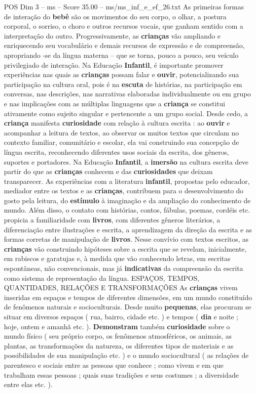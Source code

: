 \begin{textsample}{POS Dim 3 – ms – Score 35.00 – ms/ms\_inf\_e\_ef\_26.txt}
As primeiras formas de interação do \textbf{bebê} são os movimentos do seu corpo, o olhar, a postura corporal, o sorriso, o choro e outros recursos vocais, que ganham sentido com a interpretação do outro.
Progressivamente, as \textbf{crianças} vão ampliando e enriquecendo seu vocabulário e demais recursos de expressão e de compreensão, apropriando -se da língua materna – que se torna, pouco a pouco, seu veículo privilegiado de interação.
Na Educação \textbf{Infantil}, é importante promover experiências nas quais as \textbf{crianças} possam falar e \textbf{ouvir}, potencializando sua participação na cultura oral, pois é na \textbf{escuta} de histórias, na participação em conversas, nas descrições, nas narrativas elaboradas individualmente ou em grupo e nas implicações com as múltiplas linguagens que a \textbf{criança} se constitui ativamente como sujeito singular e pertencente a um grupo social.
Desde cedo, a \textbf{criança} manifesta \textbf{curiosidade} com relação à cultura escrita : ao \textbf{ouvir} e acompanhar a leitura de textos, ao observar os muitos textos que circulam no contexto familiar, comunitário e escolar, ela vai construindo sua concepção de língua escrita, reconhecendo diferentes usos sociais da escrita, dos gêneros, suportes e portadores.
Na Educação \textbf{Infantil}, a \textbf{imersão} na cultura escrita deve partir do que as \textbf{crianças} conhecem e das \textbf{curiosidades} que deixam transparecer.
As experiências com a literatura \textbf{infantil}, propostas pelo educador, mediador entre os textos e as \textbf{crianças}, contribuem para o desenvolvimento do gosto pela leitura, do \textbf{estímulo} à imaginação e da ampliação do conhecimento de mundo.
Além disso, o contato com histórias, contos, fábulas, poemas, cordéis etc. propicia a familiaridade com \textbf{livros}, com diferentes gêneros literários, a diferenciação entre ilustrações e escrita, a aprendizagem da direção da escrita e as formas corretas de manipulação de \textbf{livros}.
Nesse convívio com textos escritos, as \textbf{crianças} vão construindo hipóteses sobre a escrita que se revelam, inicialmente, em rabiscos e garatujas e, à medida que vão conhecendo letras, em escritas espontâneas, não convencionais, mas já \textbf{indicativas} da compreensão da escrita como sistema de representação da língua.
ESPAÇOS, TEMPOS, QUANTIDADES, RELAÇÕES E TRANSFORMAÇÕES As \textbf{crianças} vivem inseridas em espaços e tempos de diferentes dimensões, em um mundo constituído de fenômenos naturais e socioculturais.
Desde muito \textbf{pequenas}, elas procuram se situar em diversos espaços ( rua, bairro, cidade etc. ) e tempos ( \textbf{dia} e noite ; hoje, ontem e amanhã etc. ). \textbf{Demonstram} também \textbf{curiosidade} sobre o mundo físico ( seu próprio corpo, os fenômenos atmosféricos, os animais, as plantas, as transformações da natureza, os diferentes tipos de materiais e as possibilidades de sua manipulação etc. ) e o mundo sociocultural ( as relações de parentesco e sociais entre as pessoas que conhece ; como vivem e em que trabalham essas pessoas ; quais suas tradições e seus costumes ; a diversidade entre elas etc. ).

\end{textsample}
